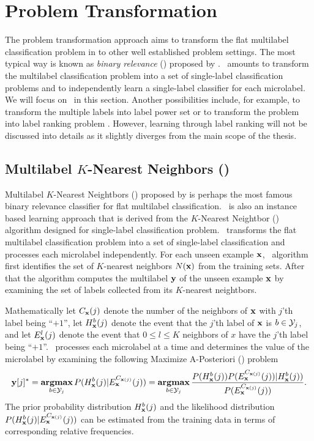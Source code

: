 {%
%
\section{Problem Transformation}

The problem transformation approach aims to transform the flat multilabel classification problem in to other well established problem settings.
The most typical way is known as \textit{binary relevance} (\br) proposed by \citet{Tsoumakas07multi,Tsoumakas10mining}.
\br\ amounts to transform the multilabel classification problem into a set of single-label classification problems and to independently learn a single-label classifier for each microlabel.
We will focus on \br\ in this section.
Another possibilities include, for example, to transform the multiple labels into label power set \citep{Tsoumakas07random} or to transform the problem into label ranking problem \citep{Elisseeff01akernel,Brinker07case,Furnkranz08multilabel,Chiang12a}.
However, learning through label ranking will not be discussed into details as it slightly diverges from the main scope of the thesis.



%
%
\subsection{Multilabel $K$-Nearest Neighbors (\mlknn)} \label{sc_mlknn}

Multilabel $K$-Nearest Neightbors (\mlknn) proposed by \citet{Zhang05a,Zhang07mlknn} is perhaps the most famous binary relevance classifier for flat multilabel classification.
\mlknn\ is also an instance based learning approach \citep{Aha91instance} that is derived from the $K$-Nearest Neightbor (\knn) algorithm designed for single-label classification problem.
\mlknn\ transforms the flat multilabel classification problem into a set of single-label classification and processes each microlabel independently.
For each unseen example $\mathbf {x}$, \mlknn\ algorithm first identifies the set of $K$-nearest neighbors $N(\mathbf {x})$ from the training sets.
After that the algorithm computes the multilabel $\mathbf {y}$ of the unseen example $\mathbf {x}$ by examining the set of labels collected from its $K$-nearest neightbors.

Mathematically 
let $C_{\mathbf {x}}(j)$ denote the number of the neighbors of $\mathbf {x}$ with $j$'th label being ``$+1$'',
let $H^b_{\mathbf {x}}(j)$ denote the event that the $j$'th label of $\mathbf {x}$ is $b\in\mathcal{Y}_j$,
and let $E_{\mathbf {x}}^l(j)$ denote the event that $0\le l \le K$ neighbors of $x$ have the $j$'th label being ``$+1$''.
\mlknn\ processes each microlabel at a time and determines the value of the microlabel by examining the following Maximize A-Posteriori (\map) problem
\begin{align*}
	\mathbf {y}[j]^* = \underset{b\in\mathcal{Y}_j}{\textbf{argmax}} \, P( H^b_{\mathbf {x}}(j) | E_{\mathbf {x}}^{C_{\mathbf {x}(j)}}(j) )
	= \underset{b\in\mathcal{Y}_j}{\textbf{argmax}} \, \frac{P( H^b_{\mathbf {x}}(j) ) P(  E_{\mathbf {x}}^{C_{\mathbf {x}(j)}}(j) ) | H^b_{\mathbf {x}}(j))}{P( E_{\mathbf {x}}^{C_{\mathbf {x}(j)}}(j))}.
\end{align*}
The prior probability distribution $H^b_{\mathbf {x}}(j)$ and the likelihood distribution $P( H^b_{\mathbf {x}}(j) | E_{\mathbf {x}}^{C_{\mathbf {x}(j)}}(j) )$ can be estimated from the training data in terms of corresponding relative frequencies.

}
